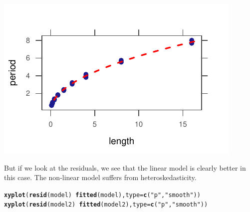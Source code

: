 \documentclass[twoside]{book}\usepackage[]{graphicx}\usepackage[]{xcolor}
\makeatletter
\def\maxwidth{ %
  \ifdim\Gin@nat@width>\linewidth
    \linewidth
  \else
    \Gin@nat@width
  \fi
}
\newcommand{\hlstr}[1]{\textcolor[rgb]{0.192,0.494,0.8}{#1}}%
\newcommand{\hlopt}[1]{\textcolor[rgb]{0,0,0}{#1}}%
\newcommand{\hlstd}[1]{\textcolor[rgb]{0.345,0.345,0.345}{#1}}%
\newcommand{\hlkwc}[1]{\textcolor[rgb]{0.333,0.667,0.333}{#1}}%
\newcommand{\hlkwd}[1]{\textcolor[rgb]{0.737,0.353,0.396}{\textbf{#1}}}%
\newenvironment{kframe}{%
 \def\at@end@of@kframe{}%
 \ifinner\ifhmode%
  \def\at@end@of@kframe{\end{minipage}}%
  \begin{minipage}{\columnwidth}%
 \fi\fi%
 \def\FrameCommand##1{\hskip\@totalleftmargin \hskip-\fboxsep
 \colorbox{shadecolor}{##1}\hskip-\fboxsep
     \hskip-\linewidth \hskip-\@totalleftmargin \hskip\columnwidth}%
 \MakeFramed {\advance\hsize-\width
   \@totalleftmargin\z@ \linewidth\hsize
   \@setminipage}}%
 {\par\unskip\endMakeFramed%
 \at@end@of@kframe}
\newenvironment{knitrout}{}{} %
\makeatother
\begin{document}
\begin{solution}
\begin{knitrout}
{\includegraphics[width=\maxwidth]{figures/fig-unnamed-chunk-228-4} 

}



\end{knitrout}
	But if we look at the residuals, we see that the linear model is clearly 
	better in this case.  The non-linear model suffers from heteroskedasticity.
\begin{knitrout}
\color{fgcolor}\begin{kframe}
\begin{alltt}
\hlkwd{xyplot}\hlstd{(}\hlkwd{resid}\hlstd{(model)} \hlopt{~} \hlkwd{fitted}\hlstd{(model),} \hlkwc{type} \hlstd{=} \hlkwd{c}\hlstd{(}\hlstr{"p"}\hlstd{,} \hlstr{"smooth"}\hlstd{))}
\hlkwd{xyplot}\hlstd{(}\hlkwd{resid}\hlstd{(model2)} \hlopt{~} \hlkwd{fitted}\hlstd{(model2),} \hlkwc{type} \hlstd{=} \hlkwd{c}\hlstd{(}\hlstr{"p"}\hlstd{,} \hlstr{"smooth"}\hlstd{))}
\end{alltt}
\end{kframe}


\end{knitrout}
\end{solution}
\end{document}
